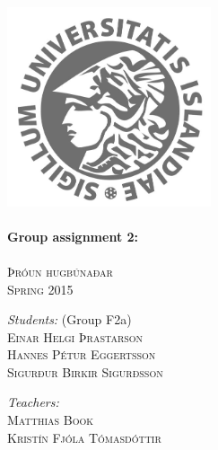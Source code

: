 \documentclass{article}
\begin{document}
\begin{titlepage}
\begin{center}

\textsc{}\\[2cm] 

\includegraphics[width=6cm]{Haskoli_Islands_rett.jpg}\\[0.5cm]

\HRule \\[0.6cm]
{ \huge \bfseries Group assignment 2: }\\[0.2cm]
\HRule \\[0.4cm]

\textsc{\normalsize Þróun hugbúnaðar} \\
\textsc{Spring 2015} \\[1.5cm]

\begin{minipage}{0.45\textwidth}
\begin{flushleft} \large
\textit{Students:} (Group F2a)\\
\textsc{Einar Helgi Þrastarson} \\
\textsc{Hannes Pétur Eggertsson} \\
\textsc{Sigurður Birkir Sigurðsson} \\
\end{flushleft}
\end{minipage}
\begin{minipage}{0.45\textwidth}
\begin{flushright} \large
\textit{Teachers:} \\
\textsc{Matthias Book}\\
\textsc{Kristín Fjóla Tómasdóttir}\\
\textsc{ }\\
\end{flushright}
\end{minipage}

\end{center}
\end{titlepage}
\end{document}
